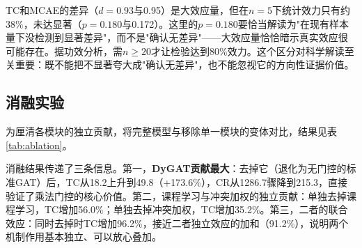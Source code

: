 \documentclass[12pt,a4paper,UTF8]{ctexart}
\begin{document}
TC和MCAE的差异（$d=0.93$与0.95）是大效应量，但在$n=5$下统计效力只有约38\%，未达显著（$p=0.180$与0.172）。这里的$p=0.180$要恰当解读为"在现有样本量下没检测到显著差异"，而不是"确认无差异"——大效应量恰恰暗示真实效应很可能存在。据功效分析，需$n\geq20$才让检验达到80\%效力。这个区分对科学解读至关重要：既不能把不显著夸大成"确认无差异"，也不能忽视它的方向性证据价值。

\subsection{消融实验}

为厘清各模块的独立贡献，将完整模型与移除单一模块的变体对比，结果见表\ref{tab:ablation}。

\begin{table}[H]
    \centering
    \caption{消融实验（$n=5$）}
    \label{tab:ablation}
\end{table}

消融结果传递了三条信息。第一，\textbf{DyGAT贡献最大}：去掉它（退化为无门控的标准GAT）后，TC从18.2上升到49.8（+173.6\%），CR从1286.7骤降到215.3，直接验证了乘法门控的核心价值。第二，课程学习与冲突加权的独立贡献：单独去掉课程学习，TC增加56.0\%；单独去掉冲突加权，TC增加35.2\%。第三，二者的联合效应：同时去掉时TC增加96.2\%，接近二者独立效应的加和（91.2\%），说明两个机制作用基本独立、可以放心叠加。
\end{document}
